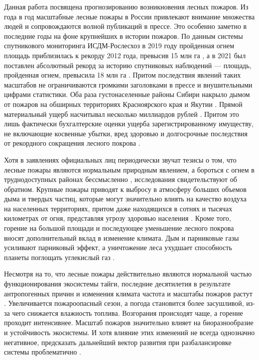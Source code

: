\documentclass[a4paper,article,14pt]{extarticle}
\begin{document}



\tableofcontents


\pagebreak
{}

Данная работа посвящена прогнозированию возникновения лесных пожаров. Из года в год масштабные лесные пожары в России привлекают внимание множества людей и сопровождаются волной публикаций в прессе. Это особенно заметно в последние годы на фоне крупнейших в истории пожаров. По данным системы спутникового мониторинга ИСДМ-Рослесхоз в 2019 году пройденная огнем площадь приблизилась к рекорду 2012 года, превысив 15 млн га \cite{2019GodMozhet2019}, а в 2021 был поставлен абсолютный рекорд за историю спутниковых наблюдений — площадь, пройденная огнем, превысила 18 млн га \cite{2021GodPolnyy2021}. Притом последствия явлений таких масштабов не ограничиваются громкими заголовками в прессе и внушительными цифрами статистики. Оба раза густонаселенные районы Сибири накрыло дымом от пожаров на обширных территориях Красноярского края \cite{DymNadSibiryu2019} и Якутии \cite{DymOtLesnyh2021}. Прямой материальный ущерб насчитывал несколько миллиардов рублей \cite{PozharyRossii20212022, YakutiiUshcherbOt2021}. Притом это лишь фактически бухгалтерские оценки ущерба зарегистрированному имуществу, не включающие косвенные убытки, вред здоровью и долгосрочные последствия от рекордного сокращения лесного покрова \cite{MinprirodyOceniliEkonomicheskiy2021}.

Хотя в заявлениях официальных лиц периодически звучат тезисы о том, что лесные пожары являются нормальным природным явлением, а бороться с огнем в труднодоступных районах бессмысленно \cite{KrasnoyarskiyGubernatorNazval2019}, исследования свидетельствуют об обратном. Крупные пожары приводят к выбросу в атмосферу больших объемов дыма и твердых частиц, которые могут значительно влиять на качество воздуха на населенных территориях, притом даже находящихся в сотнях и тысячах километрах от огня, представляя угрозу здоровью населения \cite{EfimovaAssessmentSmokePollution2021}. Кроме того, горение на большой площади и последующее уменьшение лесного покрова вносят дополнительный вклад в изменение климата. Дым и парниковые газы усиливают парниковый эффект, а уничтожение леса ухудшает способность планеты поглощать углекислый газ \cite{XuWildfiresGlobalClimate2020}.

Несмотря на то, что лесные пожары действительно являются нормальной частью функционирования экосистемы тайги, последние десятилетия в результате антропогенных причин и изменения климата частота и масштабы пожаров растут \cite{KharukWildfiresSiberianTaiga2021}. Увеличивается пожароопасный сезон, а погода становится более засушливой, из-за чего снижается влажность топлива. Возгорания происходят чаще, а горение проходит интенсивнее. Масштаб пожаров значительно влияет на биоразнообразие и устойчивость экосистемы. И хотя влияние этих изменений не всегда однозначно негативное, предсказать дальнейший вектор развития при разбалансировке системы проблематично \cite{KharukWildfiresSiberianTaiga2021}.
\end{document}
